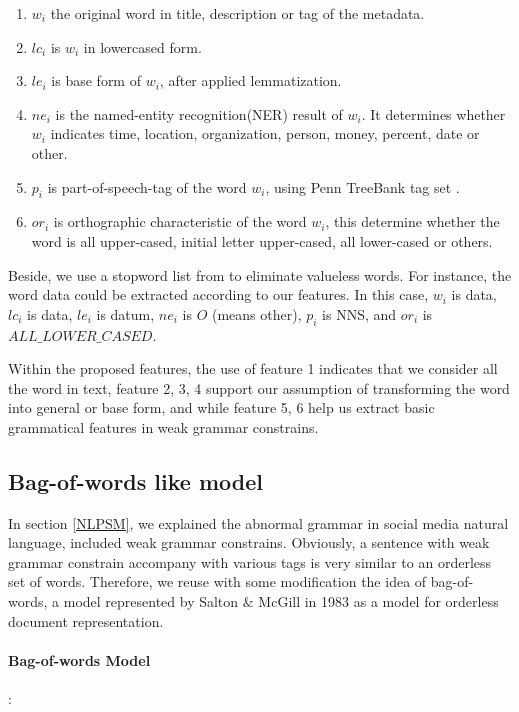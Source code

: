 \documentclass{llncs}
\begin{document}
\begin{enumerate}
\item $w_{i}$ the original word in title, description or tag of the metadata.
\item $lc_{i}$ is $w_{i}$ in lowercased form.
\item $le_{i}$ is base form of $w_{i}$, after applied lemmatization.
\item $ne_{i}$ is the named-entity recognition(NER) result of $w_{i}$. It determines whether $w_{i}$ indicates time, location, organization, person, money, percent, date or other.
\item $p_{i}$ is part-of-speech-tag of the word $w_{i}$, using Penn TreeBank tag set \cite{marcus1993building}.
\item $or_{i}$ is orthographic characteristic of the word $w_{i}$, this determine whether the word is all upper-cased, initial letter upper-cased, all lower-cased or others.

\end{enumerate}

Beside, we use a stopword list from \cite{lewis2004rcv1} to eliminate valueless words. For instance, the word data could be extracted according to our features. In this case, $w_{i}$ is data, $lc_{i}$ is data, $le_{i}$ is datum, $ne_{i}$ is $O$ (means other),  $p_{i}$ is NNS, and  $or_{i}$ is $ALL\_LOWER\_CASED$.

Within the proposed features, the use of feature 1 indicates that we consider all the word in text, feature 2, 3, 4  support our assumption of transforming the word into general or base form, and while feature 5, 6 help us extract basic grammatical features in  weak grammar constrains.

\subsection{Bag-of-words like model}
\label{BoW}

In section \ref{NLPSM}, we explained the abnormal grammar in social media natural language, included weak grammar constrains. Obviously, a sentence with weak grammar constrain accompany with various tags is very similar to an orderless set of words. Therefore, we reuse with some modification the idea of bag-of-words, a model represented by Salton $\&$ McGill in 1983 as a model for orderless document representation.

\paragraph{Bag-of-words Model}: 
\end{document}
